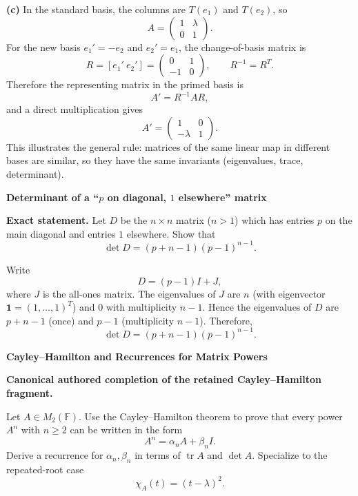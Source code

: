 \begin{solution}
\textbf{(c)} In the standard basis, the columns are $T(e_1)$ and $T(e_2)$, so
\[
\boxed{
	A=\begin{pmatrix}
		1&\lambda\\
		0&1
	\end{pmatrix}.}
\]
For the new basis $e_1'=-e_2$ and $e_2'=e_1$, the change-of-basis matrix is
\[
R=[e_1'\ e_2']=\begin{pmatrix}0&1\\-1&0\end{pmatrix},
\qquad R^{-1}=R^T.
\]
Therefore the representing matrix in the primed basis is
\[
A'=R^{-1}AR,
\]
and a direct multiplication gives
\[
\boxed{
	A'=\begin{pmatrix}
		1&0\\
		-\lambda&1
	\end{pmatrix}.}
\]
This illustrates the general rule: matrices of the same linear map in different bases are similar, so they have the same invariants
(eigenvalues, trace, determinant).
\end{solution}

\begin{problem}[CP-I-0038]
\label{prob:cp-i-0038}
\textbf{Determinant of a “\(p\) on diagonal, \(1\) elsewhere” matrix}

\textbf{Exact statement.}
\hspace*{1.5em}Let \(D\) be the \(n\times n\) matrix (\(n>1\)) which has entries \(p\) on the main diagonal and entries \(1\) elsewhere.
Show that
\[
\det D=(p+n-1)(p-1)^{n-1}.
\]

\end{problem}

\begin{solution}
Write
\[
D=(p-1)I+J,
\]
where \(J\) is the all-ones matrix.
The eigenvalues of \(J\) are \(n\) (with eigenvector \(\mathbf{1}=(1,\dots,1)^T\)) and \(0\) with multiplicity \(n-1\).
Hence the eigenvalues of \(D\) are \(p+n-1\) (once) and \(p-1\) (multiplicity \(n-1\)).
Therefore,
\[
\det D=(p+n-1)(p-1)^{n-1}.
\]
\end{solution}

\begin{problem}[CP-I-0039]
\label{prob:cp-i-0039}
\textbf{Cayley--Hamilton and Recurrences for Matrix Powers}

\textbf{Canonical authored completion of the retained Cayley--Hamilton fragment.}

\hspace*{1.5em}Let \(A\in M_2(\mathbb F)\). Use the Cayley--Hamilton theorem to prove that every
power \(A^n\) with \(n\ge 2\) can be written in the form
\[
A^n=\alpha_n A+\beta_n I.
\]
Derive a recurrence for \(\alpha_n,\beta_n\) in terms of \(\operatorname{tr}A\) and \(\det A\).
Specialize to the repeated-root case
\[
\chi_A(t)=(t-\lambda)^2.
\]
\end{problem}

